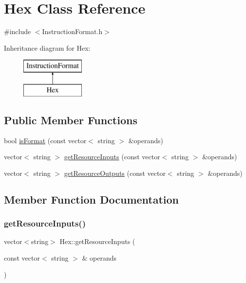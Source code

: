 \hypertarget{classHex}{}\section{Hex Class Reference}
\label{classHex}


{\ttfamily \#include $<$Instruction\+Format.\+h$>$}

Inheritance diagram for Hex\+:\begin{figure}[H]
\begin{center}
\leavevmode
\includegraphics[height=2.000000cm]{classHex}
\end{center}
\end{figure}
\subsection*{Public Member Functions}
\begin{DoxyCompactItemize}
\item 
bool \hyperlink{classHex_aabeb457d36ac38c382cf3735a9b32648}{is\+Format} (const vector$<$ string $>$ \&operands)
\item 
vector$<$ string $>$ \hyperlink{classHex_aed4f7917c651fb60226466f5f5fc9f3b}{get\+Resource\+Inputs} (const vector$<$ string $>$ \&operands)
\item 
vector$<$ string $>$ \hyperlink{classHex_a6fa1b11eff40eafe79e7291864915dd7}{get\+Resource\+Outputs} (const vector$<$ string $>$ \&operands)
\end{DoxyCompactItemize}


\subsection{Member Function Documentation}
\mbox{\label{classHex_aed4f7917c651fb60226466f5f5fc9f3b}} 
\subsubsection{\texorpdfstring{get\+Resource\+Inputs()}{getResourceInputs()}}
{\footnotesize\ttfamily vector$<$string$>$ Hex\+::get\+Resource\+Inputs (\begin{DoxyParamCaption}\item[{const vector$<$ string $>$ \&}]{operands }\end{DoxyParamCaption})\hspace{0.3cm}{\ttfamily [virtual]}}


